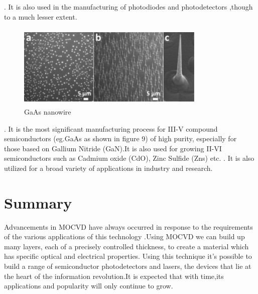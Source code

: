 \begin{flushleft}
\vspace{3mm}
. \hspace{2mm}It is also used in the manufacturing of photodiodes and photodetectors ,though\\
\hspace{7mm}to a much lesser extent. 
\vspace{5mm}
\newline
\begin{figure}[h!] 
	\centering
	\includegraphics[width=9cm, height=4cm]{images/GaAs.png} 
	\caption{GaAs nanowire}
	\label{fig:img9} 
\end{figure}
\vspace{3mm}
. \hspace{2mm}It is the most significant manufacturing process for III-V compound\\ \hspace{7mm}semiconductors (eg.GaAs as shown in figure 9) of high purity, especially for\\ \hspace{7mm}those based on Gallium Nitride (GaN).It is also used for growing II-VI\\ \hspace{7mm}semiconductors such as Cadmium oxide (CdO), Zinc Sulfide (Zns) etc.
\vspace{3mm}
. \hspace{2mm}It is also utilized for a broad variety of applications in industry and research.
\vspace{1mm}
\section{Summary}
\vspace{2mm}
Advancements in MOCVD have always occurred in response to the requirements of the various applications of this technology .Using MOCVD we can build up many layers, each of a precisely controlled thickness, to create a material which has specific optical and electrical properties.
\vspace{3mm}\newline
Using this technique it's possible to build a range of semiconductor photodetectors and lasers, the devices that lie at the heart of the information revolution.It is expected that with time,its applications and popularity will only continue to grow.
\end{flushleft}
%
